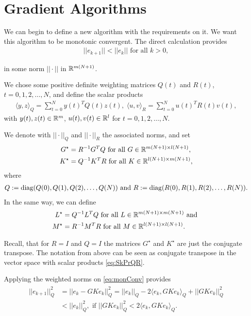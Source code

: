 	 \section{Gradient Algorithms}
We can begin to define a new algorithm with the requirements on it. We want this algorithm to be monotonic convergent.
The direct calculation provides 
\begin{align}
\label{eq:monConv}
||e_{k+1}|| < ||e_k|| \text{ for all } k >0,
\end{align}

in some norm $|| \cdot || $ in ${\mathbb{R}}^{m(N+1)}$. 

We chose some positive definite weighting matrices $Q(t)$ and $R(t)$, $t = 0, 1, 2, \dots ,N$, and define the scalar products
\begin{align}
\label{eq:SkPrQR}
\langle y,z\rangle_Q = \sum_{t = 0}^N y(t)^TQ(t)z(t), \; \langle u,v\rangle_R = \sum_{t = 0}^N u(t)^T R(t) v(t),
\end{align}
with $y(t), z(t) \in {\mathbb{R}}^{m}$, $u(t), v(t) \in {\mathbb{R}}^l$ for $t = 0,1,2, \dots, N$.

We denote with $||\cdot||_Q$ and $||\cdot||_R$ the associated norms, and set
\begin{align*}
G^\star &= R^{-1} G^T Q \text{ for all } G \in {\mathbb{R}}^{m(N+1)\times l(N+1)},\\
K^\star &= Q^{-1} K^T R \text{ for all } K \in {\mathbb{R}}^{l(N+1)\times m(N+1)},
\end{align*}
where 
\begin{align}
Q := \operatorname*{diag}(Q(0), Q(1), Q(2) ,\dots, Q(N)) \text{ and } R:= \operatorname*{diag}(R(0), R(1), R(2), \dots, R(N)).
\end{align}
In the same way, we can define 
\begin{align}
L^\star &= Q^{-1} L^T Q \text{ for all } L \in {\mathbb{R}}^{m(N+1)\times m(N+1)} \text{ and }\\
M^\star &= R^{-1} M^T R \text{ for all } M \in {\mathbb{R}}^{l(N+1)\times l(N+1)}.
\end{align}

Recall, that for $R = I$ and $Q = I$ the matrices $G^\star$ and $K^\star$ are just the conjugate transpose. The notation from above can be seen as conjugate transpose in the vector space with scalar products \eqref{eq:SkPrQR}.

Applying the weighted norms on \eqref{eq:monConv} provides
\begin{align}
\begin{split}
||e_{k+1} ||_Q^2 &= ||e_k - G K e_k||_Q^2 = ||e_k||_Q - 2\langle e_k , G K e_k \rangle_Q + ||G K e_k||_Q^2 \\ 
&< ||e_k||_Q^2, \text{ if } ||GK e_k||_Q^2 < 2 \langle e_k, GK e_k\rangle_Q. 
\end{split}
\end{align}

